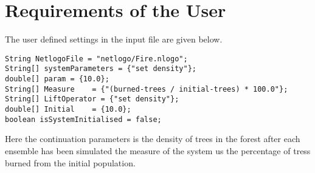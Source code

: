 \documentclass[11pt]{article}
\begin{document}
\section{Requirements of the User}
The user defined settings in the input file are given below. 
\begin{lstlisting}
String NetlogoFile = "netlogo/Fire.nlogo"; 
String[] systemParameters = {"set density"};
double[] param = {10.0}; 
String[] Measure	= {"(burned-trees / initial-trees) * 100.0"};
String[] LiftOperator = {"set density"}; 
double[] Initial	= {10.0}; 
boolean isSystemInitialised = false;  
\end{lstlisting}		
Here the continuation parameters is the density of trees in the forest after each ensemble has been simulated the measure of the system us the percentage of tress burned from the initial population.
\end{document}
